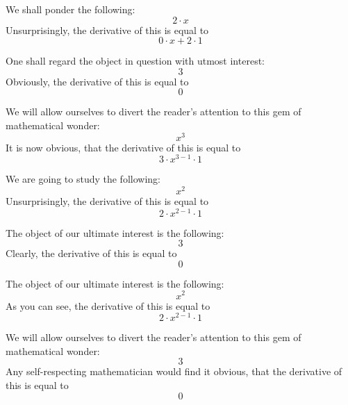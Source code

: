 \documentclass{article}
\begin{document}
We shall ponder the following:
\begin{equation}
2 \cdot x 
\end{equation}
Unsurprisingly, the derivative of this is equal to
\begin{equation}
0 \cdot x + 2 \cdot 1 
\end{equation}

One shall regard the object in question with utmost interest:
\begin{equation}
3 
\end{equation}
Obviously, the derivative of this is equal to
\begin{equation}
0 
\end{equation}

We will allow ourselves to divert the reader's attention to this gem of mathematical wonder:
\begin{equation}
x ^{3 } 
\end{equation}
It is now obvious, that the derivative of this is equal to
\begin{equation}
3 \cdot x ^{3 - 1 } \cdot 1 
\end{equation}

We are going to study the following:
\begin{equation}
x ^{2 } 
\end{equation}
Unsurprisingly, the derivative of this is equal to
\begin{equation}
2 \cdot x ^{2 - 1 } \cdot 1 
\end{equation}

The object of our ultimate interest is the following:
\begin{equation}
3 
\end{equation}
Clearly, the derivative of this is equal to
\begin{equation}
0 
\end{equation}

The object of our ultimate interest is the following:
\begin{equation}
x ^{2 } 
\end{equation}
As you can see, the derivative of this is equal to
\begin{equation}
2 \cdot x ^{2 - 1 } \cdot 1 
\end{equation}

We will allow ourselves to divert the reader's attention to this gem of mathematical wonder:
\begin{equation}
3 
\end{equation}
Any self-respecting mathematician would find it obvious, that the derivative of this is equal to
\begin{equation}
0 
\end{equation}
\end{document}
